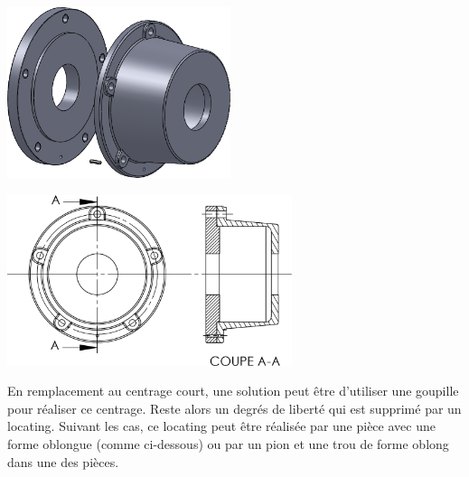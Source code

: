 \documentclass[11pt,oneside]{article}
\begin{document}
\vspace{.5cm}
\noindent\begin{minipage}[c]{.45\linewidth}
\begin{center}
\includegraphics[height=5cm]{png/PlanPrep_1}
\end{center}
\end{minipage}\hfill
\noindent\begin{minipage}[c]{.45\linewidth}
\begin{center}
\includegraphics[height=5cm]{png/PlanPrep_2}
\end{center}
\end{minipage}

\vspace{.5cm}

En remplacement au centrage court, une solution peut être d'utiliser une goupille pour réaliser ce centrage. Reste alors un degrés de liberté qui est supprimé par un locating. Suivant les cas, ce locating peut être réalisée par une pièce avec une forme oblongue (comme ci-dessous) ou par un pion et une trou de forme oblong dans une des pièces. 

\vspace{.5cm}
\end{document}
